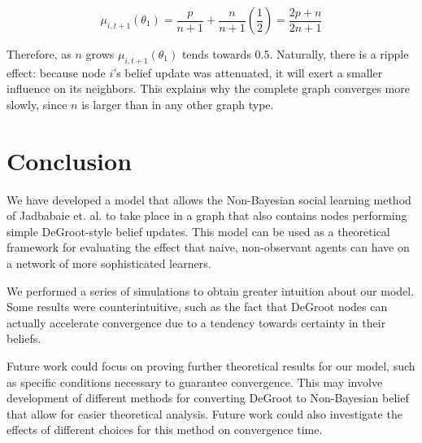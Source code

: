 \documentclass[letterpaper, 11pt, conference]{ieeeconf}
\begin{document}
\begin{equation*}
\mu_{i,t+1}(\theta_1) = \frac{p}{n+1} + \frac{n}{n+1}\left(\frac{1}{2}\right) = \frac{2p + n}{2n + 1} 
\end{equation*}

Therefore, as $n$ grows $\mu_{i,t+1}(\theta_1)$ tends towards 0.5. Naturally, there is a ripple effect: because node $i$'s belief update was attenuated, it will exert a smaller influence on its neighbors. This explains why the complete graph converges more slowly, since $n$ is larger than in any other graph type.

\section{Conclusion}

We have developed a model that allows the Non-Bayesian social learning method of Jadbabaie et. al. to take place in a graph that also contains nodes performing simple DeGroot-style belief updates.  This model can be used as a theoretical framework for evaluating the effect that naive, non-observant agents can have on a network of more sophisticated learners.

We performed a series of simulations to obtain greater intuition about our model.  Some results were counterintuitive, such as the fact that DeGroot nodes can actually accelerate convergence due to a tendency towards certainty in their beliefs.

Future work could focus on proving further theoretical results for our model, such as specific conditions necessary to guarantee convergence.  This may involve development of different methods for converting DeGroot to Non-Bayesian belief that allow for easier theoretical analysis.  Future work could also investigate the effects of different choices for this method on convergence time.



\end{document}
